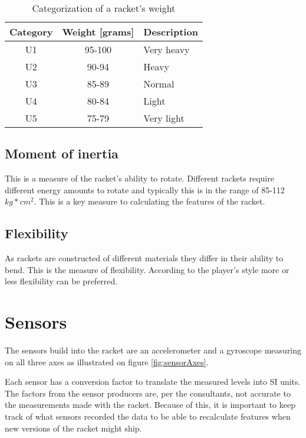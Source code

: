 \begin{table}
	\begin{center}
		\begin{tabularx}{0.7\textwidth}{C|C|L}
			\textbf{Category} & \textbf{Weight [grams]} & \textbf{Description} \\
			\hline
			U1                & 95-100                  & Very heavy           \\
			U2                & 90-94                   & Heavy                \\
			U3                & 85-89                   & Normal               \\
			U4                & 80-84                   & Light                \\
			U5                & 75-79                   & Very light           \\
		\end{tabularx}
	\end{center}
    \caption{Categorization of a racket's weight}
    \label{tab:racket:weight}
\end{table}

\subsection*{Moment of inertia}
This is a measure of the racket's ability to rotate. 
Different rackets require different energy amounts to rotate and typically this is in the range of 85-112 \(kg*cm^2\).
This is a key measure to calculating the features of the racket.

\subsection*{Flexibility}
As rackets are constructed of different materials they differ in their ability to bend. 
This is the measure of flexibility. 
According to the player's style more or less flexibility can be preferred.

\section{Sensors}
The sensors build into the racket are an accelerometer and a gyroscope measuring on all three axes as illustrated on figure \ref{fig:sensorAxes}.

Each sensor has a conversion factor to translate the measured levels into SI units.
The factors from the sensor producers are, per the consultants, not accurate to the measurements made with the racket.
Because of this, it is important to keep track of what sensors recorded the data to be able to recalculate features when new versions of the racket might ship.

